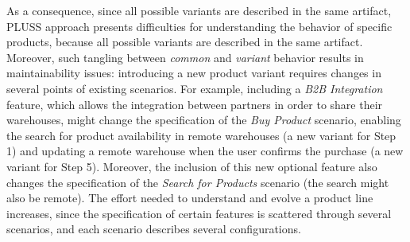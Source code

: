 \documentclass{acm_proc_article-sp}
\begin{document}
As a consequence, since all possible variants are described in the same
artifact, PLUSS approach presents difficulties for understanding the behavior
of specific products, because all possible variants are described in the same artifact. 
Moreover, such tangling between \emph{common} and
\emph{variant} behavior results in maintainability issues: introducing a new product variant
requires changes in several points of existing scenarios. For example, including a
\emph{B2B Integration} feature, which allows the integration between partners in
order to share their warehouses, might change the specification of the \emph{Buy
Product} scenario, enabling the search for product availability in remote
warehouses (a new variant for Step 1) and updating a remote warehouse when the
user confirms the purchase (a new variant for Step 5). Moreover, the inclusion of
this new optional feature also changes the specification of the \emph{Search for
Products} scenario (the search might also be remote). The effort
needed to understand and evolve a product line increases, since the
specification of certain features is scattered through several scenarios,
and each scenario describes several configurations.

\end{document}
